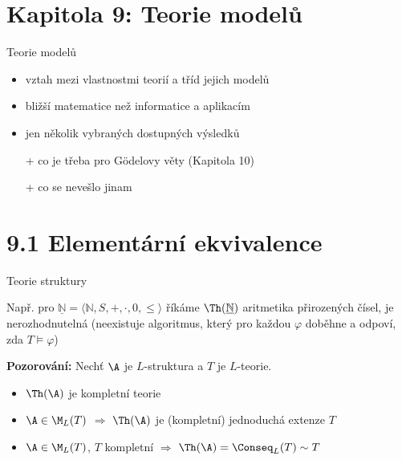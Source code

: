 \documentclass{beamer}
\begin{document}
\section{\sc Kapitola 9: Teorie modelů}


\begin{frame}{Teorie modelů}

    \begin{itemize}[<+->]
        \item vztah mezi vlastnostmi teorií a tříd jejich modelů
        \item bližší matematice než informatice a aplikacím
        \item jen několik vybraných dostupných výsledků
        \item[+] co je třeba pro Gödelovy věty (Kapitola 10)
        \item[+] co se nevešlo jinam 
    \end{itemize}

\end{frame}


\section{9.1 Elementární ekvivalence}


\begin{frame}{Teorie struktury}

    \pause

    \medskip

    \pause
    Např.  pro  $\underline{\mathbb{N}}=\langle\mathbb{N},S,+,\cdot,0,\le\rangle$ říkáme $\Th(\underline{\mathbb{N}})$ \alert{aritmetika přirozených čísel}, je \alert{nerozhodnutelná} (neexistuje algoritmus, který pro každou $\varphi$ doběhne a odpoví, zda $T\models\varphi$)

    \medskip

    \pause
    \textbf{Pozorování:} Nechť $\A$ je $L$-struktura a $T$ je $L$-teorie.\pause
    \begin{itemize}
        \item $\Th(\A)$ je kompletní teorie\pause
        \item $\A\in\M_L(T)$ $\Rightarrow$ $\Th(\A)$ je (kompletní) jednoduchá extenze $T$\pause
        \item $\A\in\M_L(T)$, $T$ kompletní $\Rightarrow$ $\Th(\A)=\Conseq_L(T)\sim T$
    \end{itemize}

\end{frame}
\end{document}
